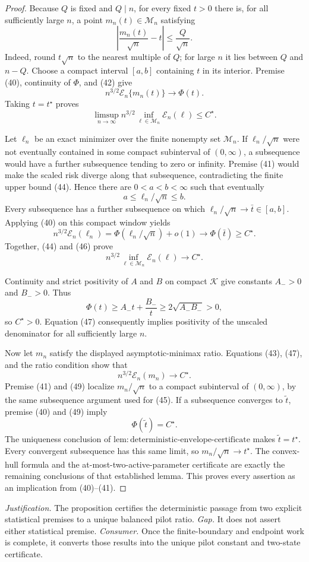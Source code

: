 \documentclass{article}
\begin{document}
\begin{proof}
Because \(Q\) is fixed and \(Q\mid n\), for every fixed \(t>0\) there is, for all sufficiently large \(n\), a point \(m_n(t)\in\mathcal M_n\) satisfying
\[
\left|\frac{m_n(t)}{\sqrt n}-t\right|
\leq\frac Q{\sqrt n}.
\tag{42}
\]
Indeed, round \(t\sqrt n\) to the nearest multiple of \(Q\); for large \(n\) it lies between \(Q\) and \(n-Q\).  Choose a compact interval \([a,b]\) containing \(t\) in its interior.  Premise (40), continuity of \(\Phi\), and (42) give
\[
n^{3/2}\mathcal E_n\{m_n(t)\}
\longrightarrow\Phi(t).
\tag{43}
\]
Taking \(t=t^\star\) proves
\[
\limsup_{n\to\infty}
n^{3/2}\inf_{\ell\in\mathcal M_n}\mathcal E_n(\ell)
\leq C^\star.
\tag{44}
\]

Let \(\ell_n\) be an exact minimizer over the finite nonempty set
\(\mathcal M_n\).  If \(\ell_n/\sqrt n\) were not eventually contained in some compact subinterval of \((0,\infty)\), a subsequence would have a further subsequence tending to zero or infinity.  Premise (41) would make the scaled risk diverge along that subsequence, contradicting the finite upper bound (44).  Hence there are \(0<a<b<\infty\) such that eventually
\[
a\leq\ell_n/\sqrt n\leq b.
\tag{45}
\]
Every subsequence has a further subsequence on which
\(\ell_n/\sqrt n\to\bar t\in[a,b]\).  Applying (40) on this compact window yields
\[
n^{3/2}\mathcal E_n(\ell_n)
=\Phi(\ell_n/\sqrt n)+o(1)
\longrightarrow\Phi(\bar t)\geq C^\star.
\tag{46}
\]
Together, (44) and (46) prove
\[
n^{3/2}\inf_{\ell\in\mathcal M_n}\mathcal E_n(\ell)
\longrightarrow C^\star.
\tag{47}
\]

Continuity and strict positivity of \(A\) and \(B\) on compact
\(\mathcal K\) give constants \(A_->0\) and \(B_->0\).  Thus
\[
\Phi(t)\geq A_-t+\frac{B_-}{t}
\geq2\sqrt{A_-B_-}>0,
\tag{48}
\]
so \(C^\star>0\).  Equation (47) consequently implies positivity of the unscaled denominator for all sufficiently large \(n\).

Now let \(m_n\) satisfy the displayed asymptotic-minimax ratio.  Equations (43), (47), and the ratio condition show that
\[
n^{3/2}\mathcal E_n(m_n)\longrightarrow C^\star.
\tag{49}
\]
Premise (41) and (49) localize \(m_n/\sqrt n\) to a compact subinterval of \((0,\infty)\), by the same subsequence argument used for (45).  If a subsequence converges to \(\widetilde t\), premise (40) and (49) imply
\[
\Phi(\widetilde t)=C^\star.
\tag{50}
\]
The uniqueness conclusion of
\(\mathrm{lem{:}deterministic\text{-}envelope\text{-}certificate}\)
makes \(\widetilde t=t^\star\).  Every convergent subsequence has this same limit, so \(m_n/\sqrt n\to t^\star\).  The convex-hull formula and the at-most-two-active-parameter certificate are exactly the remaining conclusions of that established lemma.  This proves every assertion as an implication from (40)--(41).
\end{proof}
\par\smallskip\noindent \textit{Justification.} The proposition certifies the deterministic passage from two explicit statistical premises to a unique balanced pilot ratio. \textit{Gap.} It does not assert either statistical premise. \textit{Consumer.} Once the finite-boundary and endpoint work is complete, it converts those results into the unique pilot constant and two-state certificate.
\end{document}

